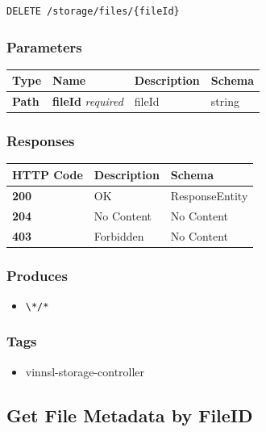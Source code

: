 \begin{verbatim}
DELETE /storage/files/{fileId}
\end{verbatim}

\subsubsection{Parameters}\label{parameters-16}

\begin{longtable}[]{@{}llll@{}}
\toprule
Type & Name & Description & Schema\tabularnewline
\midrule
\endhead
\textbf{Path} & \textbf{fileId} \emph{required} & fileId &
string\tabularnewline
\bottomrule
\end{longtable}

\subsubsection{Responses}\label{responses-19}

\begin{longtable}[]{@{}lll@{}}
\toprule
HTTP Code & Description & Schema\tabularnewline
\midrule
\endhead
\textbf{200} & OK & ResponseEntity\tabularnewline
\textbf{204} & No Content & No Content\tabularnewline
\textbf{403} & Forbidden & No Content\tabularnewline
\bottomrule
\end{longtable}

\subsubsection{Produces}\label{produces-19}

\begin{itemize}
\tightlist
\item
  \texttt{\textbackslash{}*/*}
\end{itemize}

\subsubsection{Tags}\label{tags-19}

\begin{itemize}
\tightlist
\item
  vinnsl-storage-controller
\end{itemize}

\subsection{Get File Metadata by
FileID}\label{get-file-metadata-by-fileid}

